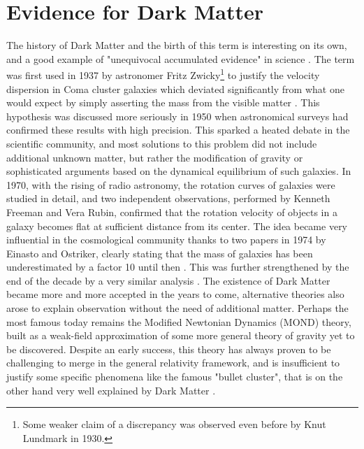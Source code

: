 \section{Evidence for Dark Matter}
\label{ch1:sec:dm-evidence}

The history of Dark Matter and the birth of this term is interesting on its own, and a good example of "unequivocal accumulated evidence" in science \cite{hooper, deSwart:2017heh}. The term was first used in 1937 by astronomer Fritz Zwicky\footnote{Some weaker claim of a discrepancy was observed even before by Knut Lundmark in 1930.} to justify the velocity dispersion in Coma cluster galaxies which deviated significantly from what one would expect by simply asserting the mass from the visible matter \cite{1933AcHPh...6..110Z}. This hypothesis was discussed more seriously in 1950 when astronomical surveys had confirmed these results with high precision. This sparked a heated debate in the scientific community, and most solutions to this problem did not include additional unknown matter, but rather the modification of gravity or  sophisticated arguments based on the dynamical equilibrium of such galaxies. In 1970, with the rising of radio astronomy, the rotation curves of galaxies were studied in detail, and two independent observations, performed by Kenneth Freeman and Vera Rubin, confirmed that the rotation velocity of objects in a galaxy becomes flat at sufficient distance from its center. The idea became very influential in the cosmological community thanks to two papers in 1974 by Einasto and Ostriker, clearly stating that the mass of galaxies has been underestimated by a factor 10 until then \cite{EINASTO1974,1974ApJ...193L...1O}. This was further strengthened by the end of the decade by a very similar analysis \cite{annurev.aa.17.090179.001031}. The existence of Dark Matter became more and more accepted in the years to come, alternative theories also arose to explain observation without the need of additional matter. Perhaps the most famous today remains the Modified Newtonian Dynamics (MOND) theory, built as a weak-field approximation of some more general theory of gravity yet to be discovered. Despite an early success, this theory has always proven to be challenging to merge in the general relativity framework, and is insufficient to justify some specific phenomena like the famous "bullet cluster", that is on the other hand very well explained by Dark Matter \cite{Clowe_2006}.

